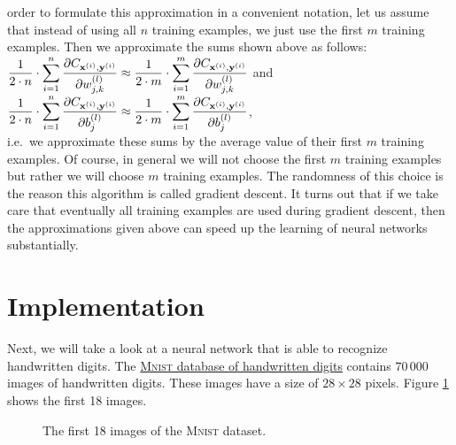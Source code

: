 order to formulate this approximation in a convenient notation, let us assume that instead of using all $n$
training examples, we just use the first $m$ training examples.  Then we approximate the sums shown above as follows:
\\[0.2cm]
\hspace*{1.3cm}
$\displaystyle \frac{1}{2\cdot n} \cdot \sum\limits_{i=1}^n \frac{\partial C_{\mathbf{x}^{(i)}, \mathbf{y}^{(i)}}}{\partial w_{j,k}^{(l)}}
 \approx
 \frac{1}{2\cdot m} \cdot \sum\limits_{i=1}^m \frac{\partial C_{\mathbf{x}^{(i)}, \mathbf{y}^{(i)}}}{\partial w_{j,k}^{(l)}}
$
\quad and \quad
$\displaystyle \frac{1}{2\cdot n} \cdot \sum\limits_{i=1}^n \frac{\partial C_{\mathbf{x}^{(i)}, \mathbf{y}^{(i)}}}{\partial b_{j}^{(l)}}
     \approx
     \frac{1}{2\cdot m} \cdot \sum\limits_{i=1}^m \frac{\partial C_{\mathbf{x}^{(i)}, \mathbf{y}^{(i)}}}{\partial b_{j}^{(l)}}
$,
\\[0.2cm]
i.e.~we approximate these sums by the average value of their first $m$ training examples.
Of course, in general we will not choose the first $m$ training examples but rather we will choose $m$ 
training examples.  The randomness of this choice is the reason this algorithm is called 
gradient descent.  It turns out that if we take care that eventually all training examples are used during
gradient descent, then the approximations given above can speed up the learning of neural networks substantially.

\section{Implementation}
Next, we will take a look at a neural network that is able to recognize handwritten digits.  The
\href{http://yann.lecun.com/exdb/mnist/}{\textsc{Mnist} database of handwritten digits}
contains $70\,000$ images of handwritten digits. These images have a size of $28 \times 28$ pixels.
Figure \ref{fig:mnist_imgs} shows the first 18 images. 

\begin{figure}[h]
  \begin{center}
  \end{center}
  \caption{The first 18 images of the \textsc{Mnist} dataset.}
  \label{fig:mnist_imgs}
\end{figure}


